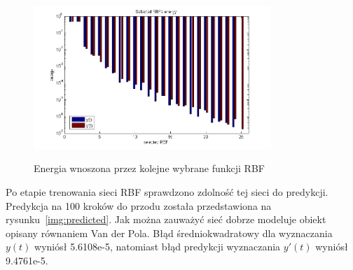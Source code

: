 \begin{figure}[ht!]
	\centering

	{\includegraphics[width=0.8\textwidth]
	{images/rbfs_energy.png}}

	\caption{Energia wnoszona przez kolejne wybrane funkcji RBF}
	\label{img:energy}
\end{figure}

Po etapie trenowania sieci RBF sprawdzono zdolność tej sieci do predykcji. Predykcja na 100 kroków do przodu została przedstawiona na rysunku~\ref{img:predicted}. Jak można zauważyć sieć dobrze modeluje obiekt opisany równaniem Van der Pola. Błąd średniokwadratowy dla wyznaczania $y(t)$ wyniósł  5.6108e-5, natomiast błąd predykcji wyznaczania $y'(t)$ wyniósł 9.4761e-5.

